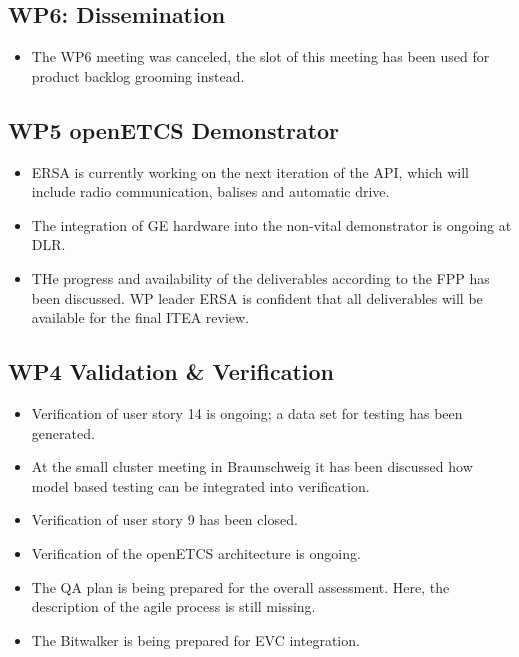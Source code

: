 \documentclass[a4paper, 11pt]{article}
\begin{document}
\subsection{WP6: Dissemination}
\begin{itemize}
\item The WP6 meeting was canceled, the slot of this meeting has been used for product backlog grooming instead.
\end{itemize}

\subsection{WP5 openETCS Demonstrator}
\begin{itemize}
\item ERSA is currently working on the next iteration of the API, which will include radio communication, balises and automatic drive.
\item The integration of GE hardware into the non-vital demonstrator is ongoing at DLR.
\item THe progress and availability of the deliverables according to the FPP has been discussed. WP leader ERSA is confident that all deliverables will be available for the final ITEA review.
\end{itemize}

\subsection{WP4 Validation \& Verification}
\begin{itemize}
\item Verification of user story 14 is ongoing; a data set for testing has been generated.
\item At the small cluster meeting in Braunschweig it has been discussed how model based testing can be integrated into verification.
\item Verification of user story 9 has been closed.
\item Verification of the openETCS architecture is ongoing.
\item The QA plan is being prepared for the overall assessment. Here, the description of the agile process is still missing.
\item The Bitwalker is being prepared for EVC integration.
\end{itemize}
\end{document}
